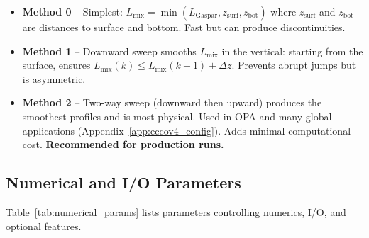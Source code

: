 \documentclass[12pt,letterpaper]{article}
\newcommand{\Lmix}{L_{\mathrm{mix}}}
\begin{document}
\begin{itemize}[leftmargin=*]
  \item \textbf{Method 0} -- Simplest: $\Lmix = \min(L_{\mathrm{Gaspar}},
        z_{\mathrm{surf}}, z_{\mathrm{bot}})$ where $z_{\mathrm{surf}}$ and
        $z_{\mathrm{bot}}$ are distances to surface and bottom. Fast but can
        produce discontinuities.

  \item \textbf{Method 1} -- Downward sweep smooths $\Lmix$ in the vertical:
        starting from the surface, ensures $\Lmix(k) \leq \Lmix(k-1) +
        \Delta z$. Prevents abrupt jumps but is asymmetric.

  \item \textbf{Method 2} -- Two-way sweep (downward then upward) produces the
        smoothest profiles and is most physical. Used in OPA and many global
        applications (Appendix~\ref{app:eccov4_config}). Adds minimal
        computational cost. \textbf{Recommended for production runs.}
\end{itemize}

\subsection{Numerical and I/O Parameters}

Table~\ref{tab:numerical_params} lists parameters controlling numerics, I/O,
and optional features.
\end{document}
